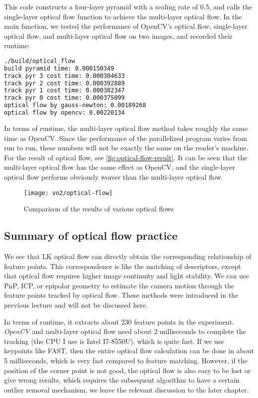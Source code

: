 This code constructs a four-layer pyramid with a scaling rate of 0.5, and calls the single-layer optical flow function to achieve the multi-layer optical flow. In the main function, we tested the performance of OpenCV's optical flow, single-layer optical flow, and multi-layer optical flow on two images, and recorded their runtime:
\begin{lstlisting}[language=sh,caption=终端输入：]
./build/optical_flow
build pyramid time: 0.000150349
track pyr 3 cost time: 0.000304633
track pyr 2 cost time: 0.000392889
track pyr 1 cost time: 0.000382347
track pyr 0 cost time: 0.000375099
optical flow by gauss-newton: 0.00189268
optical flow by opencv: 0.00220134
\end{lstlisting}
In terms of runtime, the multi-layer optical flow method takes roughly the same time as OpenCV. Since the performance of the parallelized program varies from run to run, these numbers will not be exactly the same on the reader's machine. For the result of optical flow, see \autoref{fig:optical-flow-result}. It can be seen that the multi-layer optical flow has the same effect as OpenCV, and the single-layer optical flow performs obviously worser than the multi-layer optical flow.

\begin{figure}[!htp]
	\centering
	\texttt{[image: vo2/optical-flow]}
	\caption{Comparison of the results of various optical flows}
	\label{fig:optical-flow-result}
\end{figure}

\subsection{Summary of optical flow practice}
We see that LK optical flow can directly obtain the corresponding relationship of feature points. This correspondence is like the matching of descriptors, except that optical flow requires higher image continuity and light stability. We can use PnP, ICP, or epipolar geometry to estimate the camera motion through the feature points tracked by optical flow. These methods were introduced in the previous lecture and will not be discussed here.

In terms of runtime, it extracts about 230 feature points in the experiment. \textit{OpenCV} and multi-layer optical flow need about 2 milliseconds to complete the tracking (the CPU I use is Intel I7-8550U), which is quite fast. If we use keypoints like FAST, then the entire optical flow calculation can be done in about 5 milliseconds, which is very fast compared to feature matching. However, if the position of the corner point is not good, the optical flow is also easy to be lost or give wrong results, which requires the subsequent algorithm to have a certain outlier removal mechanism, we leave the relevant discussion to the later chapter.

